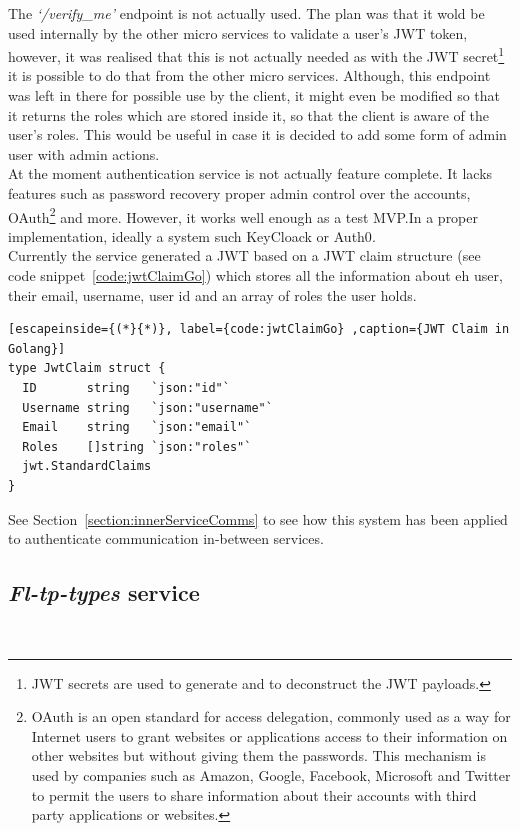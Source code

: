 \documentclass{article}
\newcommand{\vspaceconst}{-2ex}
\begin{document}
\begin{multicols}{2}
The \textit{`/verify\_me'} endpoint is not actually used. The plan was that it wold be used internally by the other micro services to validate a user's JWT token, however, it was realised that this is not actually needed as with the JWT secret\footnote{JWT secrets are used to generate and to deconstruct the JWT payloads.} it is possible to do that from the other micro services. Although, this endpoint was left in there for possible use by the client, it might even be modified so that it returns the roles which are stored inside it, so that the client is aware of the user's roles. This would be useful in case it is decided to add some form of admin user with admin actions.\\
At the moment authentication service is not actually feature complete. It lacks features such as password recovery proper admin control over the accounts, OAuth\footnote{OAuth\cite{oauth} is an open standard for access delegation, commonly used as a way for Internet users to grant websites or applications access to their information on other websites but without giving them the passwords. This mechanism is used by companies such as Amazon, Google, Facebook, Microsoft and Twitter to permit the users to share information about their accounts with third party applications or websites.} and more. However, it works well enough as a test MVP.\@ In a proper implementation, ideally a system such KeyCloack\cite{keycloack} or Auth0\cite{auth0}.\\
Currently the service generated a JWT based on a JWT claim structure (see code snippet~\ref{code:jwtClaimGo}) which stores all the information about eh user, their email, username, user id and an array of roles the user holds.\\

\lstset{language=Golang}
\begin{lstlisting}[escapeinside={(*}{*)}, label={code:jwtClaimGo} ,caption={JWT Claim in Golang}]
type JwtClaim struct {
  ID       string   `json:"id"`
  Username string   `json:"username"`
  Email    string   `json:"email"`
  Roles    []string `json:"roles"`
  jwt.StandardClaims
}
\end{lstlisting}
\lstset{language=TypeScript}

See Section~\ref{section:innerServiceComms} to see how this system has been applied to authenticate communication in-between services.\\

\subsection{\textit{Fl-tp-types} service}~\label{section:flTpTypeImpl}
\vspace{\vspaceconst}


\end{multicols}
\end{document}
